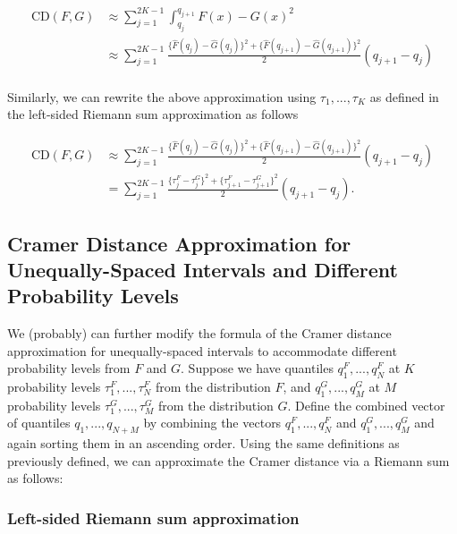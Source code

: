 \documentclass[
]{article}
\begin{document}
\begin{align}
\text{CD}(F,G) &\approx\sum^{2K-1}_{j=1}\int^{q_{j+1}}_{q_j}{F(x)−G(x)}^2\\
&\approx\sum^{2K-1}_{j=1}\frac{\{\hat{F}(q_j)-\hat{G}(q_j)\}^2+\{\hat{F}(q_{j+1})-\hat{G}(q_{j+1})\}^2}{2}(q_{j+1}-q_{j})\\
\end{align}

Similarly, we can rewrite the above approximation using
\(\tau_1,...,\tau_K\) as defined in the left-sided Riemann sum
approximation as follows

\begin{align}
\text{CD}(F,G) 
&\approx\sum^{2K-1}_{j=1}\frac{\{\hat{F}(q_j)-\hat{G}(q_j)\}^2+\{\hat{F}(q_{j+1})-\hat{G}(q_{j+1})\}^2}{2}(q_{j+1}-q_{j})\\
&=
\sum^{2K-1}_{j=1}\frac{\{\tau^F_j-\tau^G_j\}^2+\{\tau^F_{j+1}-\tau^G_{j+1}\}^2}{2}(q_{j+1}-q_{j}).
\end{align}

\hypertarget{cramer-distance-approximation-for-unequally-spaced-intervals-and-different-probability-levels}{%
\subsection{Cramer Distance Approximation for Unequally-Spaced Intervals
and Different Probability
Levels}\label{cramer-distance-approximation-for-unequally-spaced-intervals-and-different-probability-levels}}

We (probably) can further modify the formula of the Cramer distance
approximation for unequally-spaced intervals to accommodate different
probability levels from \(F\) and \(G\). Suppose we have quantiles
\(q_{1}^F,...,q_{N}^F\) at \(K\) probability levels
\(\tau_1^F,...,\tau_N^F\) from the distribution \(F\), and
\(q_{1}^G,...,q_{M}^G\) at \(M\) probability levels
\(\tau_1^G,...,\tau_M^G\) from the distribution \(G\). Define the
combined vector of quantiles \(q_1, . . . , q_{N+M}\) by combining the
vectors \(q_{1}^F,...,q_{N}^F\) and \(q_{1}^G,...,q_{M}^G\) and again
sorting them in an ascending order. Using the same definitions as
previously defined, we can approximate the Cramer distance via a Riemann
sum as follows:

\hypertarget{left-sided-riemann-sum-approximation-1}{%
\subsubsection{Left-sided Riemann sum
approximation}\label{left-sided-riemann-sum-approximation-1}}
\end{document}
